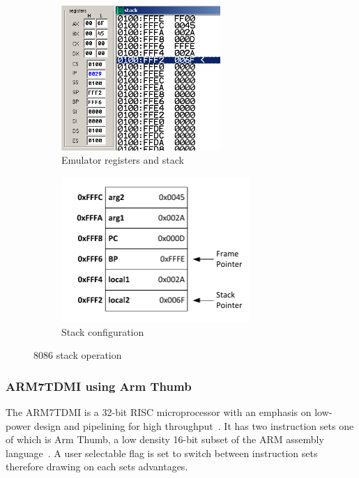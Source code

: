 \documentclass[12pt,a4paper]{article}
\begin{document}
\begin{figure}[htb]
        \centering
        \begin{subfigure}[b]{0.5\textwidth}
                \includegraphics[height=5.5cm]{Figures/emu.png}
                \caption{Emulator registers and stack}
                \label{fig:emu}
        \end{subfigure}%
        \begin{subfigure}[b]{0.5\textwidth}
                \includegraphics[height=5.5cm]{Figures/stack.pdf}
                \caption{Stack configuration}
                \label{fig:stack}
        \end{subfigure}
        \caption{8086 stack operation}
        \label{fig:8086}
\end{figure}







\subsubsection{ARM7TDMI using Arm Thumb}
The ARM7TDMI is a 32-bit RISC microprocessor with an emphasis on low-power design and pipelining for high throughput~\cite{ARM7TDMI}.
It has two instruction sets one of which is Arm Thumb, a low density 16-bit subset of the ARM assembly language~\cite{arm}.
A user selectable flag is set to switch between instruction sets therefore drawing on each sets advantages.
\end{document}
